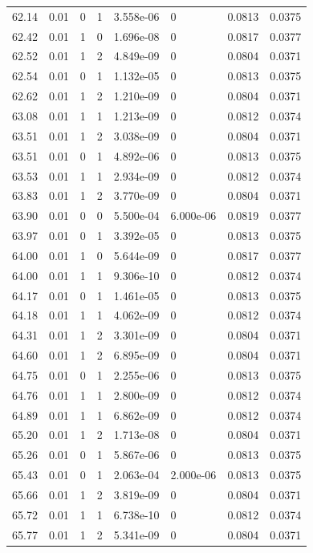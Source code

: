 \documentclass[preview]{standalone}
\begin{document}
{{{{{{{{{\begin{tabular}{L{1.2cm}C{1.2cm} C{0.3cm}C{0.5cm} C{1.4cm}C{1.4cm} C{1.4cm}C{1.4cm}}
  62.14  &  0.01  & 0     &  1 &  3.558e-06  & 0  & 0.0813 &  0.0375   \\ 
  62.42  &  0.01  & 1     &  0 &  1.696e-08  & 0  & 0.0817 &  0.0377   \\ 
  62.52  &  0.01  & 1     &  2 &  4.849e-09  & 0  & 0.0804 &  0.0371   \\ 
  62.54  &  0.01  & 0     &  1 &  1.132e-05  & 0  & 0.0813 &  0.0375   \\ 
  62.62  &  0.01  & 1     &  2 &  1.210e-09  & 0  & 0.0804 &  0.0371   \\ 
  63.08  &  0.01  & 1     &  1 &  1.213e-09  & 0  & 0.0812 &  0.0374   \\ 
  63.51  &  0.01  & 1     &  2 &  3.038e-09  & 0  & 0.0804 &  0.0371   \\ 
  63.51  &  0.01  & 0     &  1 &  4.892e-06  & 0  & 0.0813 &  0.0375   \\ 
  63.53  &  0.01  & 1     &  1 &  2.934e-09  & 0  & 0.0812 &  0.0374   \\ 
  63.83  &  0.01  & 1     &  2 &  3.770e-09  & 0  & 0.0804 &  0.0371   \\ 
  63.90  &  0.01  & 0     &  0 &  5.500e-04  & 6.000e-06  & 0.0819 &  0.0377   \\ 
  63.97  &  0.01  & 0     &  1 &  3.392e-05  & 0  & 0.0813 &  0.0375   \\ 
  64.00  &  0.01  & 1     &  0 &  5.644e-09  & 0  & 0.0817 &  0.0377   \\ 
  64.00  &  0.01  & 1     &  1 &  9.306e-10  & 0  & 0.0812 &  0.0374   \\ 
  64.17  &  0.01  & 0     &  1 &  1.461e-05  & 0  & 0.0813 &  0.0375   \\ 
  64.18  &  0.01  & 1     &  1 &  4.062e-09  & 0  & 0.0812 &  0.0374   \\ 
  64.31  &  0.01  & 1     &  2 &  3.301e-09  & 0  & 0.0804 &  0.0371   \\ 
  64.60  &  0.01  & 1     &  2 &  6.895e-09  & 0  & 0.0804 &  0.0371   \\ 
  64.75  &  0.01  & 0     &  1 &  2.255e-06  & 0  & 0.0813 &  0.0375   \\ 
  64.76  &  0.01  & 1     &  1 &  2.800e-09  & 0  & 0.0812 &  0.0374   \\ 
  64.89  &  0.01  & 1     &  1 &  6.862e-09  & 0  & 0.0812 &  0.0374   \\ 
  65.20  &  0.01  & 1     &  2 &  1.713e-08  & 0  & 0.0804 &  0.0371   \\ 
  65.26  &  0.01  & 0     &  1 &  5.867e-06  & 0  & 0.0813 &  0.0375   \\ 
  65.43  &  0.01  & 0     &  1 &  2.063e-04  & 2.000e-06  & 0.0813 &  0.0375   \\ 
  65.66  &  0.01  & 1     &  2 &  3.819e-09  & 0  & 0.0804 &  0.0371   \\ 
  65.72  &  0.01  & 1     &  1 &  6.738e-10  & 0  & 0.0812 &  0.0374   \\ 
  65.77  &  0.01  & 1     &  2 &  5.341e-09  & 0  & 0.0804 &  0.0371   \\ 
\hline 
\end{tabular} 

}}}}}}}}}
\end{document}
